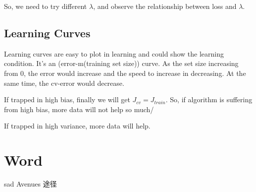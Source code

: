 \documentclass[en,11pt,english,black,simple]{../elegantbook}
\begin{document}
So, we need to try different \(\lambda\), and observe the relationship between loss and \(\lambda\). 

\subsection{Learning Curves}

Learning curves are easy to plot in learning and could show the learning condition. It's an (error-m(training set size)) curve. As the set size increasing from 0, the error would increase and the speed to increase in decreasing. At the same time, the cv-error would decrease.

If trapped in high bias, finally we will get \(J_{cv} = J_{train}\). So, if algorithm is suffering from high bias, more data will not help so much/ 

If trapped in high variance, more data will help.



\section*{Word}
sad
Avenues 途径

\let\chapname\undefined
\ifx\mainclass\undefined
\end{document}
